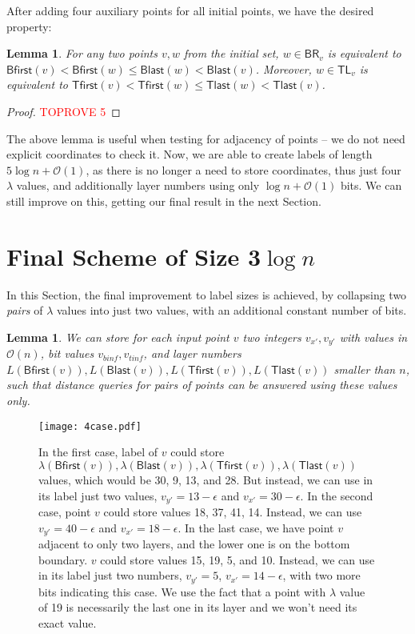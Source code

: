 \documentclass[a4paper,11pt]{article}
\newcommand{\Oh}{\mathcal{O}}
\newcommand{\eps}{\epsilon}
\newcommand{\lam}{\lambda}
\newcommand{\BR}{\mathsf{BR}}
\newcommand{\TL}{\mathsf{TL}}
\newcommand{\Blast}{\mathsf{Blast}}
\newcommand{\Bfirst}{\mathsf{Bfirst}}
\newcommand{\Tlast}{\mathsf{Tlast}}
\newcommand{\Tfirst}{\mathsf{Tfirst}}
\newtheorem{lemma}[theorem]{Lemma}
\begin{document}
After adding four auxiliary points for all initial points, we have the desired property:
\begin{lemma}
For any two points $v,w$ from the initial set, $w \in \BR_v$ is equivalent to $\Bfirst(v) < \Bfirst(w) \leq \Blast(w) < \Blast(v)$.
Moreover, $w \in \TL_v$ is equivalent to $\Tfirst(v) < \Tfirst(w) \leq \Tlast(w) < \Tlast(v)$.
\label{Lem:Dist1}
\end{lemma}
\begin{proof}\textcolor{red}{TOPROVE 5}\end{proof}

The above lemma is useful when testing for adjacency of points -- we do not need explicit coordinates to check it.
Now, we are able to create labels of length $5\log{n}+\Oh(1)$,
as there is no longer a need to store coordinates, thus just four $\lam$ values,
and additionally layer numbers using only $\log{n}+\Oh(1)$ bits.
We can still improve on this, getting our final result in the next Section.



\section{Final Scheme of Size 3$\log{n}$}
\label{Sec:3log}

In this Section, the final improvement to label sizes is achieved, by collapsing two \emph{pairs} of $\lam$ values into
just two values, with an additional constant number of bits.

\begin{lemma}
We can store for each input point $v$ two integers $v_{x'},v_{y'}$ with values in $\Oh(n)$, bit values $v_{binf},v_{tinf}$,
and layer numbers $L(\Bfirst(v)),L(\Blast(v)),L(\Tfirst(v)),L(\Tlast(v))$ smaller than $n$,
such that distance queries for pairs of points can be answered using these values only.
\end{lemma}
\label{Lem:Main}

\begin{figure}[h!]
\begin{center}
  \texttt{[image: 4case.pdf]}
\end{center}
\caption{In the first case, label of $v$ could store $\lam(\Bfirst(v)),\lam(\Blast(v)),\lam(\Tfirst(v)),\lam(\Tlast(v))$ 
values, which would be 30, 9, 13, and 28.
But instead, we can use in its label just two values, $v_{y'}=13-\eps$ and $v_{x'}=30-\eps$.
In the second case, point $v$ could store values 18, 37, 41, 14.
Instead, we can use $v_{y'}=40-\eps$ and $v_{x'}=18-\eps$.
\newline In the last case, we have point $v$ adjacent to only two layers,
and the lower one is on the bottom boundary.
$v$ could store values 15, 19, 5, and 10.
Instead, we can use in its label just two numbers, $v_{y'}=5$, $v_{x'}=14-\eps$, with two more bits indicating this case.
We use the fact that a point with $\lam$ value of 19 is necessarily the last one in its layer
and we won't need its exact value.}
\label{Fig:Stored}
\end{figure}
\end{document}
